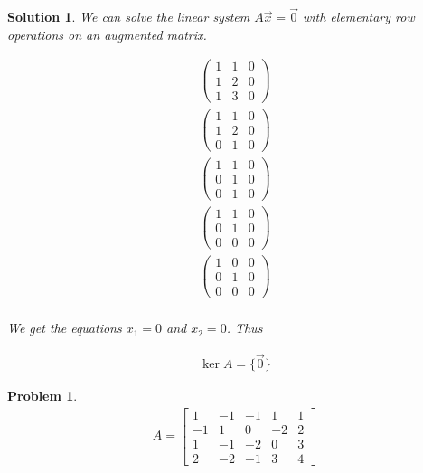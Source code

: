 \documentclass{article}
\newtheorem{problem}{Problem}
\newtheorem*{solution}{Solution}
\begin{document}
\begin{solution}
We can solve the linear system $A\vec{x} = \vec{0}$ with elementary row operations on an augmented matrix.

\begin{align*}
\left( \begin{array}{cc|c}1 & 1 & 0 \\ 1 & 2 & 0 \\ 1 & 3 & 0 \end{array} \right) \\
\left( \begin{array}{cc|c}1 & 1 & 0 \\ 1 & 2 & 0 \\ 0 & 1 & 0 \end{array} \right) \\
\left( \begin{array}{cc|c}1 & 1 & 0 \\ 0 & 1 & 0 \\ 0 & 1 & 0 \end{array} \right) \\
\left( \begin{array}{cc|c}1 & 1 & 0 \\ 0 & 1 & 0 \\ 0 & 0 & 0 \end{array} \right) \\
\left( \begin{array}{cc|c}1 & 0 & 0 \\ 0 & 1 & 0 \\ 0 & 0 & 0 \end{array} \right) \\
\end{align*}

We get the equations $x_{1} = 0$ and $x_{2} = 0$. Thus 

\begin{align*}
\ker A = \{ \vec{0} \}
\end{align*}

\end{solution}

\begin{problem}
\begin{align*}
A = \begin{bmatrix}1 & -1 & -1 & 1 & 1 \\ -1 & 1 & 0 & -2 & 2 \\ 1 & -1 & -2 & 0 & 3 \\ 2 & -2 & -1 & 3 & 4 \end{bmatrix}
\end{align*}
\end{problem}
\end{document}
